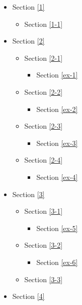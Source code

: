 \documentclass[11pt]{article}
\providecommand{\tightlist}{%
      \setlength{\itemsep}{0pt}\setlength{\parskip}{0pt}}
\begin{document}
\begin{itemize}
\tightlist
\item
  Section \ref{1}

  \begin{itemize}
  \tightlist
  \item
    Section \ref{1-1}
  \end{itemize}
\item
  Section \ref{2}

  \begin{itemize}
  \tightlist
  \item
    Section \ref{2-1}

    \begin{itemize}
    \tightlist
    \item
      Section \ref{ex-1}
    \end{itemize}
  \item
    Section \ref{2-2}

    \begin{itemize}
    \tightlist
    \item
      Section \ref{ex-2}
    \end{itemize}
  \item
    Section \ref{2-3}

    \begin{itemize}
    \tightlist
    \item
      Section \ref{ex-3}
    \end{itemize}
  \item
    Section \ref{2-4}

    \begin{itemize}
    \tightlist
    \item
      Section \ref{ex-4}
    \end{itemize}
  \end{itemize}
\item
  Section \ref{3}

  \begin{itemize}
  \tightlist
  \item
    Section \ref{3-1}

    \begin{itemize}
    \tightlist
    \item
      Section \ref{ex-5}
    \end{itemize}
  \item
    Section \ref{3-2}

    \begin{itemize}
    \tightlist
    \item
      Section \ref{ex-6}
    \end{itemize}
  \item
    Section \ref{3-3}
  \end{itemize}
\item
  Section \ref{4}
\end{itemize}
\end{document}
